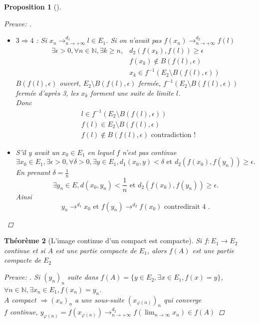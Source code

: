 \documentclass{article}
\theoremstyle{plain}%
\newtheorem{thm}{Théorème}[section]
\newtheorem{prop}[thm]{Proposition}
\theoremstyle{definition}
\theoremstyle{remark}
\begin{document}
\begin{prop}[]
\begin{proof}[Preuve: ]
\begin{itemize}
            \item $ 3 \Rightarrow 4 $ : Si $ x_n \to ^{d_1} _{n \to +\infty } l \in E_1$. Si on n'avait pas $ f(x_n) \to ^{d_2} _{n \to +\infty } f(l) $ 
            \begin{align*}
                \exists \epsilon > 0, \forall n \in \mathbb{N}, \exists k \geq n, & d_2(f(x_k) , f(l)) \geq \epsilon \\
                    & f(x_k) \not \in B(f(l), \epsilon )\\
                    & x_k \in f^{-1}(E_2 \setminus B(f(l), \epsilon ))
            \end{align*}
            $ B(f(l), \epsilon ) $ ouvert, $ E_2 \setminus B(f(l), \epsilon ) $ fermée, $ f^{-1}(E_2 \setminus B(f(l), \epsilon )) $ fermée d'après 3, les $ x_k $ forment une suite de limite $ l $. \\
            Donc 
            \begin{align*}
                & l \in f^{-1}(E_2 \setminus B(f(l), \epsilon )) \\
                & f(l) \in E_2 \setminus B(f(l), \epsilon ) \\
                & f(l) \not\in B(f(l), \epsilon) \text{ contradiction !}
            \end{align*}

            \item S'il y avait un $ x_0 \in E_1 $ en lequel $ f $ n'est pas continue 
            \[
                \exists x_0 \in E_1, \exists \epsilon > 0, \forall \delta > 0, \exists y \in E_1, d_1(x_0, y) < \delta \text{ et } d_2(f(x_0), f(y_n)) \geq \epsilon 
            .\]
            En prenant $ \delta = \frac{1}{n} $ 
            \[
                \exists y_n \in E, d(x_0, y_n) < \frac{1}{n} \text{ et } d_2(f(x_0) , f(y_n)) \geq \epsilon 
            .\]
            Ainsi 
            \[
                y_n \to ^{d_1} x_0 \text{ et } f(y_n) \to ^{d_2} f(x_0) \text{ contredirait 4 }
            .\]           
        \end{itemize}
    \end{proof}
\end{prop}

\begin{thm}[L'image continue d'un compact est compacte]
    Si $ f : E_1 \to E_2 $ continue et si $ A $ est une partie compacte de $ E_1 $, alors $ f(A) $ est une partie compacte de $ E_2 $ 

    \begin{proof}[Preuve: ]
        Si $ (y_n)_n $ suite dans $ f(A) = \{y \in E_2, \exists x \in E_1, f(x) = y \} $, $ \forall n \in \mathbb{N}, \exists x_n \in E_1, f(x_n) = y_n $. \\
        $ A $ compact $ \Rightarrow (x_n)_n $ a une sous-suite $ (x_{\varphi (n)})_n $ qui converge \\
        $ f $ continue, $ y_{\varphi (n)} = f(x_{\varphi (n)}) \to ^{d_2}_{n \to +\infty } f(\lim_{n \to \infty} x_n) \in f(A) $ 
    \end{proof}
\end{thm}
\end{document}

